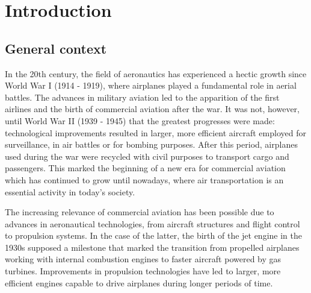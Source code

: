 \chapter{Introduction}
\label{ch1:introduction}

    

\section{General context}





In the 20th century, the field of aeronautics has experienced a hectic growth since World War I (1914 - 1919), where airplanes played a fundamental role in aerial battles. The advances in military aviation led to the apparition of the first airlines and the birth of commercial aviation after the war. It was not, however, until World War II (1939 - 1945) that the greatest progresses were made: technological improvements resulted in larger, more efficient aircraft employed for surveillance, in air battles or for bombing purposes. After this period, airplanes used during the war were recycled with civil purposes to transport cargo and passengers. This marked the beginning of a new era for commercial aviation which has continued to grow until nowadays, where air transportation is an essential activity in today's society.

The increasing relevance of commercial aviation has been possible due to advances in aeronautical technologies, from aircraft structures and flight control to propulsion systems. In the case of the latter, the birth of the jet engine in the 1930s supposed a milestone that marked the transition from propelled airplanes working with internal combustion engines to faster aircraft powered by gas turbines. Improvements in propulsion technologies have led to larger, more efficient engines capable to drive airplanes during longer periods of time.


